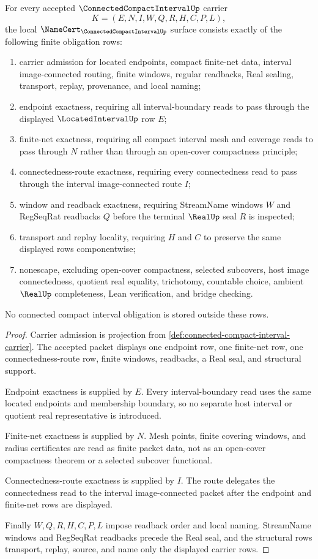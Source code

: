 \begin{theorem}
\label{thm:connected-compact-interval-namecert-obligations}
For every accepted $\ConnectedCompactIntervalUp$ carrier
$$
K=(E,N,I,W,Q,R,H,C,P,L),
$$
the local $\NameCert_{\ConnectedCompactIntervalUp}$ surface consists exactly of the following finite obligation rows:
\begin{enumerate}
\item carrier admission for located endpoints, compact finite-net data, interval image-connected routing, finite windows, regular readbacks, Real sealing, transport, replay, provenance, and local naming;
\item endpoint exactness, requiring all interval-boundary reads to pass through the displayed $\LocatedIntervalUp$ row $E$;
\item finite-net exactness, requiring all compact interval mesh and coverage reads to pass through $N$ rather than through an open-cover compactness principle;
\item connectedness-route exactness, requiring every connectedness read to pass through the interval image-connected route $I$;
\item window and readback exactness, requiring StreamName windows $W$ and RegSeqRat readbacks $Q$ before the terminal $\RealUp$ seal $R$ is inspected;
\item transport and replay locality, requiring $H$ and $C$ to preserve the same displayed rows componentwise;
\item nonescape, excluding open-cover compactness, selected subcovers, host image connectedness, quotient real equality, trichotomy, countable choice, ambient $\RealUp$ completeness, Lean verification, and bridge checking.
\end{enumerate}
No connected compact interval obligation is stored outside these rows.
\end{theorem}
\begin{proof}
Carrier admission is projection from \autoref{def:connected-compact-interval-carrier}. The accepted packet displays one endpoint row, one finite-net row, one connectedness-route row, finite windows, readbacks, a Real seal, and structural support.

Endpoint exactness is supplied by $E$. Every interval-boundary read uses the same located endpoints and membership boundary, so no separate host interval or quotient real representative is introduced.

Finite-net exactness is supplied by $N$. Mesh points, finite covering windows, and radius certificates are read as finite packet data, not as an open-cover compactness theorem or a selected subcover functional.

Connectedness-route exactness is supplied by $I$. The route delegates the connectedness read to the interval image-connected packet after the endpoint and finite-net rows are displayed.

Finally $W,Q,R,H,C,P,L$ impose readback order and local naming. StreamName windows and RegSeqRat readbacks precede the Real seal, and the structural rows transport, replay, source, and name only the displayed carrier rows.
\end{proof}

